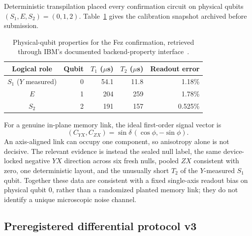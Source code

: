\documentclass[aps,prl,reprint,superscriptaddress,nofootinbib]{revtex4-2}
\begin{document}
Deterministic transpilation placed every confirmation circuit on physical qubits $(S_1,E,S_2)=(0,1,2)$.  Table~\ref{tab:fez-qubits} gives the calibration snapshot archived before submission.
\begin{table}[t]
\caption{Physical-qubit properties for the Fez confirmation, retrieved through IBM's documented backend-property interface~\cite{IBMBackendDetails2026}.}
\label{tab:fez-qubits}
\begin{ruledtabular}
\begin{tabular}{crrrr}
Logical role & Qubit & $T_1$ ($\mu$s) & $T_2$ ($\mu$s) & Readout error\\
\hline
$S_1$ ($Y$ measured) & 0 & 54.1 & 11.8 & 1.18\%\\
$E$ & 1 & 204 & 259 & 1.78\%\\
$S_2$ & 2 & 191 & 157 & 0.525\%\\
\end{tabular}
\end{ruledtabular}
\end{table}

For a genuine in-plane memory link, the ideal first-order signal vector is
\begin{equation}
 (C_{YX},C_{ZX})=\sin\delta\,(\cos\phi,-\sin\phi).
 \label{eq:dark-signal-vector}
\end{equation}
An axis-aligned link can occupy one component, so anisotropy alone is not decisive.  The relevant evidence is instead the sealed null label, the same device-locked negative $YX$ direction across six fresh nulls, pooled $ZX$ consistent with zero, one deterministic layout, and the unusually short $T_2$ of the $Y$-measured $S_1$ qubit.  Together these data are consistent with a fixed single-axis readout bias on physical qubit 0, rather than a randomized planted memory link; they do not identify a unique microscopic noise channel.

\subsection{Preregistered differential protocol v3}
\end{document}
